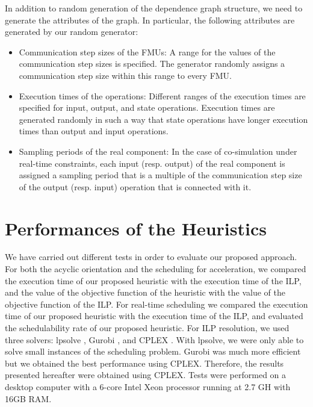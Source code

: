 In addition to random generation of the dependence graph structure, we need to generate the attributes of the graph. In particular, the following attributes are generated by our random generator:
\begin{itemize}
\item Communication step sizes of the FMUs: A range for the values of the communication step sizes is specified. The generator randomly assigns a communication step size within this range to every FMU. 
\item Execution times of the operations: Different ranges of the execution times are specified for input, output, and state operations. Execution times are generated randomly in such a way that state operations have longer execution times than output and input operations.
\item Sampling periods of the real component: In the case of co-simulation under real-time constraints, each input (resp. output) of the real component is assigned a sampling period that is a multiple of the communication step size of the output (resp. input) operation that is connected with it.
\end{itemize}

\section{Performances of the Heuristics}

We have carried out different tests in order to evaluate our proposed approach. For both the acyclic orientation and the scheduling for acceleration, we compared the execution time of our proposed heuristic with the execution time of the ILP, and the value of the objective function of the heuristic with the value of the objective function of the ILP. For real-time scheduling we compared the execution time of our proposed heuristic with the execution time of the ILP, and evaluated the schedulability rate of our proposed heuristic. For ILP resolution, we used three solvers: lpsolve \cite{berkelaar:2004}, Gurobi \cite{gurobi:2016}, and CPLEX \cite{cplex:2017}. With lpsolve, we were only able to solve small instances of the scheduling problem. Gurobi was much more efficient but we obtained the best performance using CPLEX. Therefore, the results presented hereafter were obtained using CPLEX. %
Tests were performed on a desktop computer with a 6-core Intel Xeon processor running at 2.7 GH with 16GB RAM.

